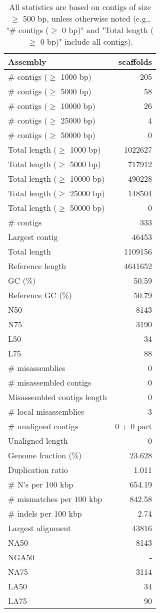 \documentclass[12pt,a4paper]{article}
\begin{document}
\begin{table}[ht]
\begin{center}
\caption{All statistics are based on contigs of size $\geq$ 500 bp, unless otherwise noted (e.g., "\# contigs ($\geq$ 0 bp)" and "Total length ($\geq$ 0 bp)" include all contigs).}
\begin{tabular}{|l*{1}{|r}|}
\hline
Assembly & scaffolds \\ \hline
\# contigs ($\geq$ 1000 bp) & 205 \\ \hline
\# contigs ($\geq$ 5000 bp) & 58 \\ \hline
\# contigs ($\geq$ 10000 bp) & 26 \\ \hline
\# contigs ($\geq$ 25000 bp) & 4 \\ \hline
\# contigs ($\geq$ 50000 bp) & 0 \\ \hline
Total length ($\geq$ 1000 bp) & 1022627 \\ \hline
Total length ($\geq$ 5000 bp) & 717912 \\ \hline
Total length ($\geq$ 10000 bp) & 490228 \\ \hline
Total length ($\geq$ 25000 bp) & 148504 \\ \hline
Total length ($\geq$ 50000 bp) & 0 \\ \hline
\# contigs & 333 \\ \hline
Largest contig & 46453 \\ \hline
Total length & 1109156 \\ \hline
Reference length & 4641652 \\ \hline
GC (\%) & 50.59 \\ \hline
Reference GC (\%) & 50.79 \\ \hline
N50 & 8143 \\ \hline
N75 & 3190 \\ \hline
L50 & 34 \\ \hline
L75 & 88 \\ \hline
\# misassemblies & 0 \\ \hline
\# misassembled contigs & 0 \\ \hline
Misassembled contigs length & 0 \\ \hline
\# local misassemblies & 3 \\ \hline
\# unaligned contigs & 0 + 0 part \\ \hline
Unaligned length & 0 \\ \hline
Genome fraction (\%) & 23.628 \\ \hline
Duplication ratio & 1.011 \\ \hline
\# N's per 100 kbp & 654.19 \\ \hline
\# mismatches per 100 kbp & 842.58 \\ \hline
\# indels per 100 kbp & 2.74 \\ \hline
Largest alignment & 43816 \\ \hline
NA50 & 8143 \\ \hline
NGA50 & - \\ \hline
NA75 & 3114 \\ \hline
LA50 & 34 \\ \hline
LA75 & 90 \\ \hline
\end{tabular}
\end{center}
\end{table}
\end{document}
